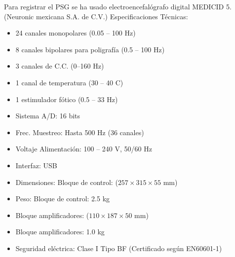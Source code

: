 Para registrar el PSG se ha usado 
{electroencefal\'ografo digital MEDICID 5.} 
(Neuronic mexicana S.A. de C.V.)
Especificaciones T\'ecnicas:
\begin{itemize}
\item 24 canales monopolares (0.05 -- 100 Hz)
\item 8 canales bipolares para poligraf\'ia (0.5 -- 100 Hz)
\item 3 canales de C.C. (0--160 Hz)
\item 1 canal de temperatura (30 -- 40 C)
\item 1 estimulador f\'otico (0.5 -- 33 Hz)
\item Sistema A/D: 16 bits
\item Frec. Muestreo: Hasta 500 Hz (36 canales)
\item Voltaje Alimentaci\'on: 100 -- 240 V, 50/60 Hz
\item Interfaz: USB
\item Dimensiones: Bloque de control: ($257 \times 315 \times 55$ mm)
\item Peso: Bloque de control: 2.5 kg
\item Bloque amplificadores: ($110\times 187\times 50$ mm)
\item Bloque amplificadores: 1.0 kg
\item Seguridad el\'ectrica: Clase I Tipo BF (Certificado según EN60601-1)
\end{itemize}

